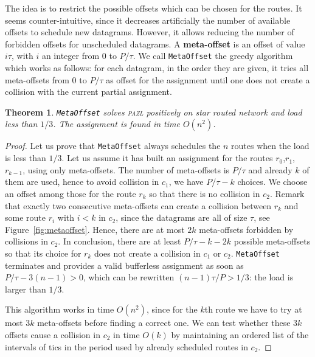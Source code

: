 \documentclass[a4paper,10pt]{article}
\newcommand\metaoffset{\texttt{MetaOffset}\xspace}
\newtheorem{theorem}{Theorem}
\newcommand\pazl{\textsc{pazl}\xspace}
\begin{document}
     The idea is to restrict the possible offsets which can be chosen for the routes. It seems counter-intuitive, since it decreases artificially the number of available offsets to schedule new datagrams. However, it allows reducing the number of forbidden offsets for unscheduled datagrams. A \textbf{meta-offset} is an offset of value $i\tau$, with $i$ an integer from $0$ to $P / \tau$. We call \metaoffset the greedy algorithm which works as follows: for each datagram, in the order they are given, it tries all meta-offsets from $0$ to $P/\tau$ as offset for the assignment until one does not create a collision with the current partial assignment. 


\begin{theorem}
\metaoffset solves \pazl positively on star routed network and load less than $1/3$. 
The assignment is found in time $O(n^2)$.
\end{theorem}
    \begin{proof}
    Let us prove that \metaoffset always schedules the $n$ routes when the load is less than $1/3$. Let us assume it has built an assignment for the routes $r_0$,$r_1$, $r_{k-1}$, using only meta-offsets. The number of meta-offsets is $P/\tau$ and already $k$ of them are used, hence to avoid collision in $c_1$, we have $P/\tau - k$ choices. We choose an offset among those for the route $r_k$ so that there is no collision in $c_2$. Remark that exactly two consecutive meta-offsets can create a collision between $r_k$ and some route $r_i$ with $i < k$ in $c_2$, since the datagrams are all of size $\tau$, see Figure~\ref{fig:metaoffset}. Hence, there are at most $2k$ meta-offsets forbidden by collisions in $c_2$. In conclusion, there are at least $P/\tau - k - 2k$ possible meta-offsets so that its choice for $r_k$ does not create a collision in $c_1$ or $c_2$.  \metaoffset terminates and provides a valid bufferless assignment as soon as $P/\tau - 3(n-1) > 0$, which can be rewritten $(n-1)\tau /P > 1/3$: the load is larger than $1/3$.

     This algorithm works in time $O(n^2)$, since for the $k$th route we have to try at most $3k$ meta-offsets before finding a correct one. We can test whether these $3k$ offsets cause a collision in $c_2$ in time $O(k)$ by maintaining an ordered list of the intervals of tics in the period used by already scheduled routes in $c_2$.
     \end{proof}
         
\end{document}
